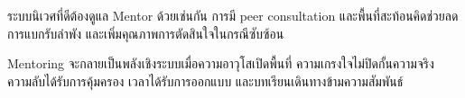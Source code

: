 \begin{mentornote}
ระบบนิเวศที่ดีต้องดูแล Mentor ด้วยเช่นกัน การมี peer consultation และพื้นที่สะท้อนคิดช่วยลดการแบกรับลำพัง และเพิ่มคุณภาพการตัดสินใจในกรณีซับซ้อน
\end{mentornote}

\begin{keytakeaway}
Mentoring จะกลายเป็นพลังเชิงระบบเมื่อความอาวุโสเปิดพื้นที่ ความเกรงใจไม่ปิดกั้นความจริง ความลับได้รับการคุ้มครอง เวลาได้รับการออกแบบ และบทเรียนเดินทางข้ามความสัมพันธ์
\end{keytakeaway}

